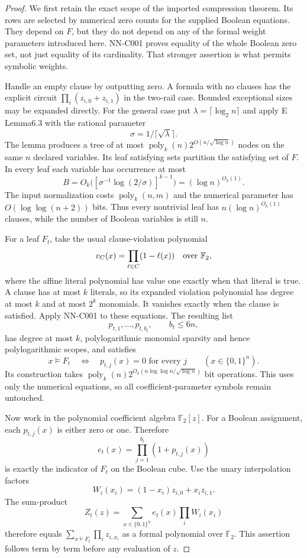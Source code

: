 \begin{proof}
We first retain the exact scope of the imported compression theorem. Its rows are selected by numerical zero counts for the supplied Boolean equations. They depend on $F$, but they do not depend on any of the formal weight parameters introduced here. NN-C001 proves equality of the whole Boolean zero set, not just equality of its cardinality. That stronger assertion is what permits symbolic weights.

Handle an empty clause by outputting zero. A formula with no clauses has the explicit circuit $\prod_i(z_{i,0}+z_{i,1})$ in the two-rail case. Bounded exceptional sizes may be expanded directly. For the general case put $\lambda=\lceil\log_2 n\rceil$ and apply E Lemma6.3 with the rational parameter
\[
                         \sigma=1/\lceil\sqrt\lambda\rceil.
\]
The lemma produces a tree of at most $\operatorname{poly}_k(n)2^{O(n/\sqrt{\log n})}$ nodes on the same $n$ declared variables. Its leaf satisfying sets partition the satisfying set of $F$. In every leaf each variable has occurrence at most
\[
 B=O_k\bigl([\sigma^{-1}\log(2/\sigma)]^{k-1}\bigr)
                                  =(\log n)^{O_k(1)}.
\]
The input normalization costs $\operatorname{poly}_k(n,m)$ and the numerical parameter has $O(\log\log(n+2))$ bits. Thus every nontrivial leaf has $n(\log n)^{O_k(1)}$ clauses, while the number of Boolean variables is still $n$.

For a leaf $F_t$, take the usual clause-violation polynomial
\[
                  v_C(x)=\prod_{\ell\in C}(1-\ell(x))
                                         \quad\hbox{over }\mathbb F_2,
\]
where the affine literal polynomial has value one exactly when that literal is true. A clause has at most $k$ literals, so its expanded violation polynomial has degree at most $k$ and at most $2^k$ monomials. It vanishes exactly when the clause is satisfied. Apply NN-C001 to these equations. The resulting list
\[
                   p_{t,1},\ldots,p_{t,b_t},\qquad b_t\le6n,
\]
has degree at most $k$, polylogarithmic monomial sparsity and hence polylogarithmic scopes, and satisfies
\[
 x\models F_t\quad\Longleftrightarrow\quad
              p_{t,j}(x)=0\text{ for every }j
                     \qquad(x\in\{0,1\}^n).
\]
Its construction takes $\operatorname{poly}_k(n)2^{O_k(n\log\log n/\sqrt{\log n})}$ bit operations. This uses only the numerical equations, so all coefficient-parameter symbols remain untouched.

Now work in the polynomial coefficient algebra $\mathbb F_2[z]$. For a Boolean assignment, each $p_{t,j}(x)$ is either zero or one. Therefore
\[
                e_t(x)=\prod_{j=1}^{b_t}(1+p_{t,j}(x))
\]
is exactly the indicator of $F_t$ on the Boolean cube. Use the unary interpolation factors
\[
                   W_i(x_i)=(1-x_i)z_{i,0}+x_i z_{i,1}.
\]
The sum-product
\[
              Z_t(z)=\sum_{x\in\{0,1\}^n}e_t(x)\prod_iW_i(x_i)
\]
therefore equals $\sum_{x\models F_t}\prod_i z_{i,x_i}$ as a formal polynomial over $\mathbb F_2$. This assertion follows term by term before any evaluation of $z$.


\end{proof}
